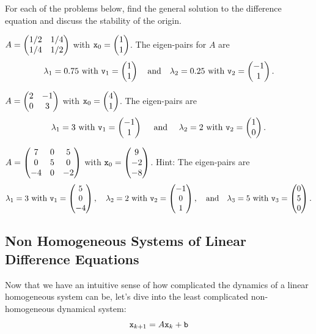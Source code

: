 % 
\begin{problem}
    For each of the problems below, find the general solution to the difference equation
    and discuss the stability of the origin.

    \ba
        \item $A = \begin{pmatrix} 1/2 & 1/4 \\ 1/4 & 1/2 \end{pmatrix}$ with $\texttt{x}_0 = \begin{pmatrix} 1\\1 \end{pmatrix}$.  The
            eigen-pairs for $A$ are
            \[ \lambda_1=0.75 \text{ with } \texttt{v}_1 = \begin{pmatrix} 1 \\ 1 \end{pmatrix} \quad \text{and}
            \quad \lambda_2 = 0.25 \text{ with } \texttt{v}_2 = \begin{pmatrix} -1 \\ 1 \end{pmatrix}. \]
        \item $A = \begin{pmatrix} 2 & -1 \\ 0 & 3 \end{pmatrix}$ with $\texttt{x}_0 = \begin{pmatrix} 4 \\ 1 \end{pmatrix}$.  The
            eigen-pairs are
            \[ \lambda_1 = 3 \text{ with } \texttt{v}_1 = \begin{pmatrix} -1 \\ 1 \end{pmatrix} \quad \text{ and
            }\quad \lambda_2 = 2 \text{ with } \texttt{v}_2 = \begin{pmatrix} 1 \\ 0 \end{pmatrix}. \]
        \item $A = \begin{pmatrix} 7 & 0 & 5 \\ 0 & 5 & 0 \\ -4 & 0 & -2 \end{pmatrix}$ with $\texttt{x}_0 = \begin{pmatrix} 9
            \\ -2 \\ -8 \end{pmatrix}$.  Hint: The eigen-pairs are
            \[ \lambda_1=3 \text{ with } \texttt{v}_1 = \begin{pmatrix} 5 \\ 0 \\ -4 \end{pmatrix}, \quad \lambda_2 =
                2 \text{ with } \texttt{v}_2 = \begin{pmatrix} -1 \\ 0 \\ 1 \end{pmatrix}, \quad \text{and} \quad
            \lambda_3 = 5 \text{ with } \texttt{v}_3 = \begin{pmatrix} 0 \\ 5 \\ 0 \end{pmatrix}. \]
    \ea
    
\end{problem}




\subsection{Non Homogeneous Systems of Linear Difference Equations}
Now that we have an intuitive sense of how complicated the dynamics of a linear
homogeneous system can be, let's dive into the least complicated non-homogeneous dynamical
system:
\[ \texttt{x}_{k+1} = A \texttt{x}_k + \texttt{b} \]

